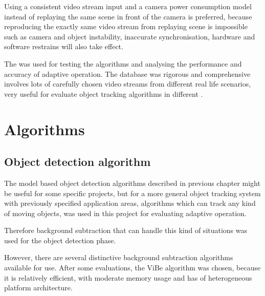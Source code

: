 Using a consistent video stream input and a camera power consumption model instead of replaying the same scene in front of the camera is preferred, because reproducing the exactly same video stream from replaying scene is impossible such as camera and object instability, inaccurate synchronisation, hardware and software restrains will also take effect.

The  \cite{goyette2012changedetection} was used for testing the algorithms and analysing the performance and accuracy of adaptive operation. The database was rigorous and comprehensive involves lots of carefully chosen video streams from different real life scenarios,  very useful for evaluate object tracking algorithms in different .

\section{Algorithms}

\subsection{Object detection algorithm}

The model based object detection algorithms described in previous chapter might be useful for some specific projects, but for a more general object tracking system with previously specified application areas,  algorithms which can track any kind of moving objects, was used in this project for evaluating adaptive operation.

 Therefore background subtraction that can handle this kind of situations was used for the object detection phase.

However, there are several distinctive background subtraction algorithms available for use. After some evaluations, the ViBe algorithm was chosen, because it is relatively efficient, with moderate memory usage and has  of heterogeneous platform architecture.

